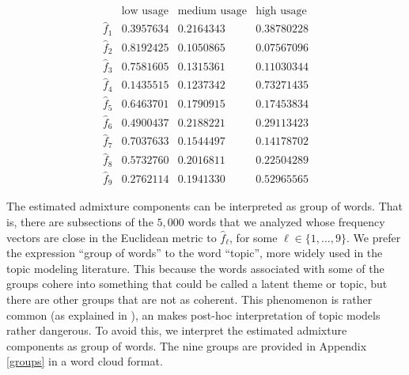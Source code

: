 \documentclass[12pt, reqno]{amsart}
\theoremstyle{definition}
\begin{document}
$$ \begin{matrix}
 & \text{low usage} & \text{medium usage} & \text{high usage} \\
\hat{f}_1 & 0.3957634 & 0.2164343 & 0.38780228 \\
\hat{f}_2 & 0.8192425 & 0.1050865 & 0.07567096 \\
\hat{f}_3 & 0.7581605 & 0.1315361 & 0.11030344 \\
\hat{f}_4 & 0.1435515 & 0.1237342 & 0.73271435 \\
\hat{f}_5 & 0.6463701 & 0.1790915 & 0.17453834 \\
\hat{f}_6 & 0.4900437 & 0.2188221 & 0.29113423 \\
\hat{f}_7 & 0.7037633 & 0.1544497 & 0.14178702 \\
\hat{f}_8 & 0.5732760 & 0.2016811 & 0.22504289 \\
\hat{f}_9 & 0.2762114 & 0.1941330 & 0.52965565 
\end{matrix}  $$


The estimated admixture components can be interpreted as group of words. That is, there are subsections of the $5,000$ words that we analyzed whose frequency vectors are close in the Euclidean metric to $\hat{f}_\ell$, for some $\ell \in \{1,\ldots,9\}$. We prefer the expression ``group of words'' to the word ``topic'', more widely used in the topic modeling literature. This because the words associated with some of the groups cohere into something that could be called a latent theme or topic, but there are other groups that are not as coherent. This phenomenon is rather common (as explained in \cite{bail}), an makes post-hoc interpretation of topic models rather dangerous. To avoid this, we interpret the estimated admixture components as group of words. The nine groups are provided in Appendix \ref{groups} in a word cloud format.
\end{document}
